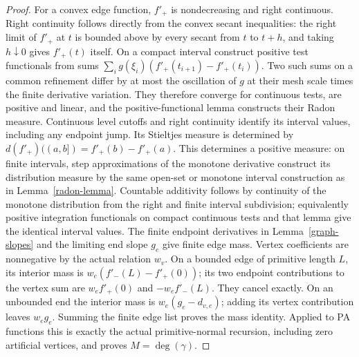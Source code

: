 \begin{proof}
For a convex edge function, $f'_+$ is nondecreasing and right continuous.
Right continuity follows directly from the convex secant inequalities:
the right limit of $f'_+$ at $t$ is bounded above by every secant from
$t$ to $t+h$, and taking $h\downarrow0$ gives $f'_+(t)$ itself.
On a compact interval construct positive test functionals from sums
$\sum_i g(\xi_i)(f'_+(t_{i+1})-f'_+(t_i))$.
Two such sums on a common refinement differ by at most the oscillation
of $g$ at their mesh scale times the finite derivative variation.
They therefore converge for continuous tests, are positive and linear,
and the positive-functional lemma constructs their Radon measure.
Continuous level cutoffs and right continuity identify its interval
values, including any endpoint jump. Its Stieltjes measure is determined by
$d(f'_+)((a,b])=f'_+(b)-f'_+(a)$. This determines a positive measure:
on finite intervals, step approximations of the monotone derivative
construct its distribution measure by the same open-set or monotone
interval construction as in Lemma~\ref{radon-lemma}. Countable additivity
follows by continuity of the monotone distribution from the right and
finite interval subdivision; equivalently positive integration functionals
on compact continuous tests and that lemma give the identical interval
values. The finite endpoint derivatives in Lemma~\ref{graph-slopes}
and the limiting end slope $g_e$ give finite edge mass.
Vertex coefficients are nonnegative by the actual relation $w_v$.
On a bounded edge of primitive length $L$, its interior mass is
$w_e(f'_-(L)-f'_+(0))$; its two endpoint contributions to the vertex
sum are $w_ef'_+(0)$ and $-w_ef'_-(L)$. They cancel exactly.
On an unbounded end the interior mass is $w_e(g_e-d_{v,e})$;
adding its vertex contribution leaves $w_eg_e$. Summing the finite
edge list proves the mass identity. Applied to PA functions this is
exactly the actual primitive-normal recursion, including zero artificial
vertices, and proves $M=\deg(\gamma)$.


\end{proof}

